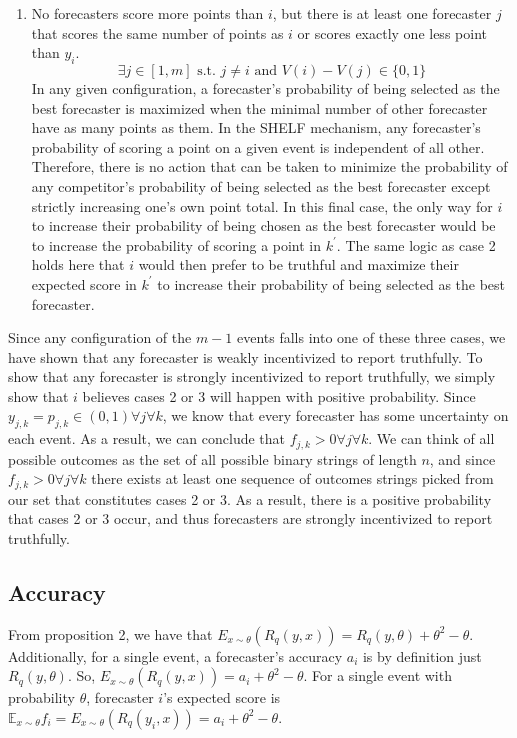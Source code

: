 \documentclass[letterpaper,12pt]{article}
\newcommand{\E}{\mathbb{E}}
\newcommand{\1}{\mathbbm{1}}
\begin{document}
\begin{enumerate}
    \item No forecasters score more points than $i$, but there is at least one forecaster $j$ that scores the same number of points as $i$ or scores exactly one less point than $y_i$.
    $$\exists j \in [1,m] \text{ s.t. } j \ne i \text{ and } V(i) - V(j) \in \{0,1\}$$
    In any given configuration, a forecaster's probability of being selected as the best forecaster is maximized when the minimal number of other forecaster have as many points as them. In the SHELF mechanism, any forecaster's probability of scoring a point on a given event is independent of all other. Therefore, there is no action that can be taken to minimize the probability of any competitor's probability of being selected as the best forecaster except strictly increasing one's own point total. In this final case, the only way for $i$ to increase their probability of being chosen as the best forecaster would be to increase the probability of scoring a point in $k^\prime$. The same logic as case 2 holds here that $i$ would then prefer to be truthful and maximize their expected score in $k^\prime$ to increase their probability of being selected as the best forecaster.
\end{enumerate}

Since any configuration of the $m-1$ events falls into one of these three cases, we have shown that any forecaster is weakly incentivized to report truthfully.
To show that any forecaster is strongly incentivized to report truthfully, we simply show that $i$ believes cases 2 or 3 will happen with positive probability. Since $y_{j,k} = p_{j,k} \in (0,1) \forall j \forall k$, we know that every forecaster has some uncertainty on each event. As a result, we can conclude that $f_{j,k} > 0 \forall j \forall k$. We can think of all possible outcomes as the set of all possible binary strings of length $n$, and since $f_{j,k} > 0 \forall j \forall k$ there exists at least one sequence of outcomes strings picked from our set that constitutes cases 2 or 3. As a result, there is a positive probability that cases 2 or 3 occur, and thus forecasters are strongly incentivized to report truthfully.  

\subsection{Accuracy}

From proposition 2, we have that $E_{x \sim \theta}(R_q(y, x)) = R_q(y, \theta) + \theta^2 - \theta$. Additionally, for a single event, a forecaster's accuracy $a_i$ is by definition just $R_q(y, \theta)$. So, $E_{x \sim \theta}(R_q(y, x)) = a_i + \theta^2 - \theta$. For a single event with probability $\theta$, forecaster $i$'s expected score is $\E_{x \sim \theta} f_i = E_{x \sim \theta}(R_q(y_i, x)) = a_i + \theta^2 - \theta$.
\end{document}
